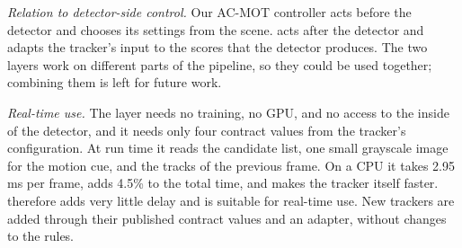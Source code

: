 \emph{Relation to detector-side control.} Our AC-MOT controller acts
before the detector and chooses its settings from the scene. \scl{}
acts after the detector and adapts the tracker's input to the scores that the
detector produces. The two layers work on different parts of the pipeline,
so they could be used together; combining them is left for future work.

\emph{Real-time use.} The layer needs no training, no GPU, and no access to
the inside of the detector, and it needs only four contract values from the
tracker's configuration. At run time it reads the candidate list, one small
grayscale image for the motion cue, and the tracks of the previous frame. On
a CPU it takes 2.95 ms per frame, adds 4.5\% to the total time, and makes the
tracker itself faster. \scl{} therefore adds very little delay and is
suitable for real-time use. New trackers are added through their published
contract values and an adapter, without changes to the rules.
